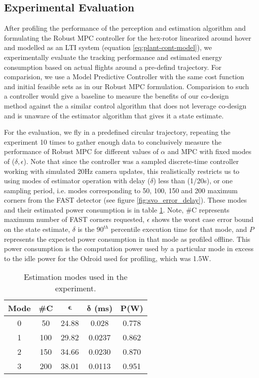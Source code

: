 \subsection{Experimental Evaluation}

After profiling the performance of the perception and estimation algorithm and formulating the Robust MPC controller for the hex-rotor linearized around hover and modelled as an LTI system (equation \ref{eq:plant-cont-model}), we experimentally evaluate the tracking performance and estimated energy consumption based on actual flights around a pre-defind trajectory. For comparision, we use a Model Predictive Controller with the same cost function and initial feasible sets as in our Robust MPC formulation. Comparision to such a controller would give a baseline to measure the benefits of our co-design method against the a similar control algorithm that does not leverage co-design and is unaware of the estimator algorithm that gives it a state estimate. 

For the evaluation, we fly in a predefined circular trajectory, repeating the experiment 10 times to gather enough data to conclusively measure the performance of Robust MPC for different values of $\alpha$ and MPC with fixed modes of ($\delta,\epsilon$). Note that since the controller was a sampled discrete-time controller working with simulated 20Hz camera updates, this realistically restricts us to using modes of estimator operation with delay ($\delta$) less than (1/20s), or one sampling period, i.e. modes corresponding to 50, 100, 150 and 200 maximum corners from the FAST detector (see figure \ref{fig:svo_error_delay}). These modes and their estimated power consumption is in table \ref{tbl:modes_exp}. Note, \#C represents maximum number of FAST corners requested, $\epsilon$ shows the worst case error bound on the state estimate, $\delta$ is the $90^{th}$ percentile execution time for that mode, and $P$ represents the expected power consumption in that mode as profiled offline. This power consumption is the computation power used by a particular mode in excess to the idle power for the Odroid used for profiling, which was 1.5W.

\begin{table}[htb]
\begin{center}
\caption{Estimation modes used in the experiment.}
\label{tbl:modes_exp}
\begin{tabular} {|c|c|c|c|c|}
	\hline
	\textbf{Mode} & \textbf{\#C} & $\pmb{\epsilon}$ & $\pmb{\delta}$ \textbf{(ms)} & $\pmb{P}$\textbf{(W)} \\ \hline
	0 & 50 &  24.88 & 0.028 &  0.778  \\ \hline
 	1 & 100 & 29.82 & 0.0237 &  0.862  \\ \hline
	2 & 150 & 34.66 & 0.0230 & 0.870 \\ \hline
	3 & 200 & 38.01 & 0.0113 & 0.951 \\ \hline
	\end{tabular}	
	\end{center}
\end{table}


